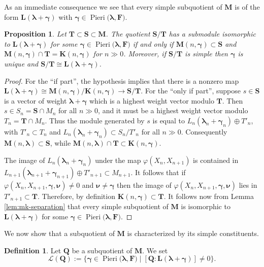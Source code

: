 \documentclass[11pt,fleqn]{amsart}
\renewcommand\to{\longrightarrow}
\renewcommand\phi{\varphi}
\newtheorem{prop}[thm]{Proposition}
\theoremstyle{definition}
\newtheorem{defn}[thm]{Definition}
\theoremstyle{remark}
\theoremstyle{remark}
\newcommand\wt[1]{\boldsymbol{#1}}
\newcommand\Pieri[2]{\operatorname{Pieri}{(#1},{#2)}}
\newcommand\map[4]{\phi(#3,#4,#1,#2)}
\begin{document}
As an immediate consequence we see that every simple subquotient of $\mathbf M$
is of the form $\mathbf L(\wt\lambda + \wt\gamma)$ with $
\wt\gamma \in \Pieri{\wt\lambda}{\mathbf F}$.
\begin{prop}
\label{prop:simple-submodules}
Let $\mathbf T \subset \mathbf S \subset \mathbf M$. The quotient $\mathbf S/
\mathbf T$ has a submodule isomorphic to $\mathbf L(\wt\lambda+\wt\gamma)$ 
for some $\wt\gamma \in \Pieri{\wt\lambda}{\mathbf F}$
if and only if $\mathbf M(n,\wt\gamma) \subset \mathbf S$ and $\mathbf M(n,
\wt\gamma) \cap \mathbf T = \mathbf K(n,\wt\gamma)$ for $n \gg 0$. Moreover, 
if $\mathbf 
S / \mathbf T$ is simple then $\wt\gamma$ is unique and $\mathbf S / \mathbf T 
\cong \mathbf L(\wt\lambda+\wt\gamma)$.
\end{prop}
\begin{proof}
For the ``if part'', the hypothesis implies that there is a nonzero map $\mathbf
L(\wt\lambda+\wt\gamma) \cong \mathbf M(n,\wt\gamma)/\mathbf K(n,\wt\gamma) 
\to \mathbf S/\mathbf T$. For the ``only if part'', suppose $s \in \mathbf S$ is a 
vector of weight $\wt\lambda+\wt\gamma$ which is a highest weight vector modulo 
$\mathbf T$. Then $s \in S_n = \mathbf S \cap M_n$ for all $n \gg 0$, and it 
must be a highest weight vector modulo $T_n = \mathbf T \cap M_n$. Thus 
the module generated by $s$ is equal to $L_n(\wt\lambda_n+\wt\gamma_n) \oplus 
T'_n$, with $T'_n \subset T_n$ and $L_n(\wt\lambda_n + \wt\gamma_n) \subset 
S_n / T'_n$ for all $n \gg 0$. Consequently $\mathbf M(n,\wt\lambda) \subset 
\mathbf S$, while $\mathbf M(n,\wt\lambda) \cap \mathbf T \subset \mathbf 
K(n,\wt\gamma)$.

The image of $L_n(\wt\lambda_n + \wt\gamma_n)$ under the map $\phi(X_n,X_{n+1})$ 
is contained in $L_{n+1}(\wt\lambda_{n+1} + \wt\gamma_{n+1}) \oplus T'_{n+1}
\subset M_{n+1}$. It follows that if $\map{\wt\gamma}{\wt\nu}{X_n}{X_{n+1}} 
\neq 0$ and $\wt\nu \neq \wt\gamma$ then the image of $\map{\wt\gamma}{\wt\nu}
{X_n}{X_{n+1}}$ lies in $T'_{n+1} \subset \mathbf T$. Therefore, by definition 
$\mathbf K(n,\wt\gamma) \subset \mathbf T$. It follows now from Lemma 
\ref{lem:mk-separation} that every simple subquotient of $\mathbf M$ is 
isomorphic to $\mathbf L(\wt\lambda + \wt\gamma)$ for some $\wt\gamma \in 
\Pieri{\wt\lambda}{\mathbf F}$.
\end{proof}

We now show that a subquotient of $\mathbf M$ is characterized by its simple 
constituents. 
\begin{defn}
Let $\mathbf Q$ be a subquotient of $\mathbf M$. We set
\[
  \mathcal L(\mathbf Q) := \{\wt\gamma \in \Pieri{\wt\lambda}{\mathbf F}
    \mid [\mathbf Q: \mathbf L(\wt\lambda+\wt\gamma)] \neq 0\}.  
\]
\end{defn}
\end{document}
